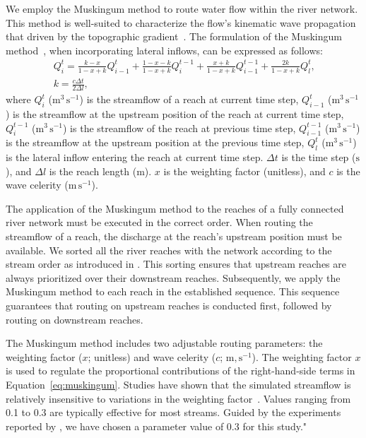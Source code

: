 \documentclass[draft]{agujournal2019}
\begin{document}
We employ the Muskingum method to route water flow within the river network. This method is well-suited to characterize the flow's kinematic wave propagation that driven by the topographic gradient~\cite{ponce1978JHD}. The formulation of the Muskingum method~\cite{cunge1969JHD, fenton2019JH}, when incorporating lateral inflows, can be expressed as follows:
\begin{eqnarray}
  Q_{i}^{t} = \frac{k - x}{1 - x + k} Q_{i-1}^{t} + \frac{1 - x - k}{1 - x + k} Q_{i}^{t-1} + \frac{x + k}{1 - x + k} Q_{i-1}^{t-1} + \frac{2k}{1 - x + k} Q_l^t \textrm{,} \label{eq:muskingum}\\
  k  = \frac{c \Delta t} {2 \Delta l} \textrm{,}
\end{eqnarray}
where $Q_{i}^{t}$ ($\textrm{m}^3\,\textrm{s}^{-1}$) is the streamflow of a reach at current time step, $Q_{i-1}^{t}$ ($\textrm{m}^3\,\textrm{s}^{-1}$) is the streamflow at the upstream position of the reach at current time step, $Q_{i}^{t-1}$ ($\textrm{m}^3\,\textrm{s}^{-1}$) is the streamflow of the reach at previous time step, $Q_{i-1}^{t-1}$ ($\textrm{m}^3\,\textrm{s}^{-1}$) is the streamflow at the upstream position at the previous time step, $Q_l^t$ ($\textrm{m}^3\,\textrm{s}^{-1}$) is the lateral inflow entering the reach at current time step. $\Delta t$ is the time step ($\textrm{s}$), and $\Delta l$ is the reach length ($\textrm{m}$). $x$ is the weighting factor (unitless), and $c$ is the wave celerity ($\textrm{m}\,\textrm{s}^{-1}$).

The application of the Muskingum method to the reaches of a fully connected river network must be executed in the correct order. When routing the streamflow of a reach, the discharge at the reach's upstream position must be available. We sorted all the river reaches with the network according to the stream order as introduced in \cite{yang2024W}. This sorting ensures that upstream reaches are always prioritized over their downstream reaches. Subsequently, we apply the Muskingum method to each reach in the established sequence. This sequence guarantees that routing on upstream reaches is conducted first, followed by routing on downstream reaches.

The Muskingum method includes two adjustable routing parameters: the weighting factor ($x$; unitless) and wave celerity ($c$; $\textrm{m},\textrm{s}^{-1}$). The weighting factor $x$ is used to regulate the proportional contributions of the right-hand-side terms in Equation~\ref{eq:muskingum}. Studies have shown that the simulated streamflow is relatively insensitive to variations in the weighting factor~\cite{koussis1978JHD}. Values ranging from 0.1 to 0.3 are typically effective for most streams. Guided by the experiments reported by , we have chosen a parameter value of 0.3 for this study."
\end{document}
